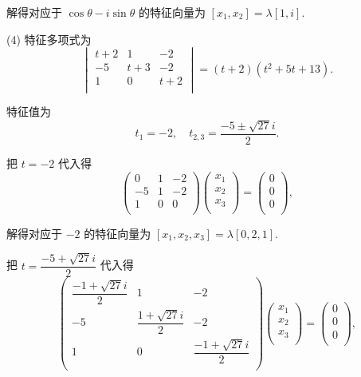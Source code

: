 \documentclass[color=black,device=normal,lang=cn,mode=geye]{elegantnote}
\begin{document}
\begin{solution}
    解得对应于 $\cos\theta-i\sin\theta$ 的特征向量为 $[x_1,x_2]=\lambda[1,i]$.

    (4) 特征多项式为
    \[\begin{vmatrix}
        t+2 & 1 & -2 \\
        -5 & t+3 & -2 \\
        1 & 0 & t+2 \\
    \end{vmatrix}=(t+2)(t^2+5t+13).\]

    特征值为
    \[t_1=-2,\quad t_{2,3}=\dfrac{-5\pm\sqrt{27}i}{2}.\]

    把 $t=-2$ 代入得
    \[\begin{pmatrix}
        0 & 1 & -2 \\
        -5 & 1 & -2 \\
        1 & 0 & 0 \\
    \end{pmatrix}\begin{pmatrix}
        x_1 \\
        x_2 \\
        x_3 \\
    \end{pmatrix}=\begin{pmatrix}
        0 \\
        0 \\
        0 \\
    \end{pmatrix},\]

    解得对应于 $-2$ 的特征向量为 $[x_1,x_2,x_3]=\lambda[0,2,1]$.

    把 $t=\dfrac{-5+\sqrt{27}i}{2}$ 代入得
    \[\begin{pmatrix}
        \dfrac{-1+\sqrt{27}i}{2} & 1 & -2 \\
        -5 & \dfrac{1+\sqrt{27}i}{2} & -2 \\
        1 & 0 & \dfrac{-1+\sqrt{27}i}{2} \\
    \end{pmatrix}\begin{pmatrix}
        x_1 \\
        x_2 \\
        x_3 \\
    \end{pmatrix}=\begin{pmatrix}
        0 \\
        0 \\
        0 \\
    \end{pmatrix},\]


\end{solution}
\end{document}
